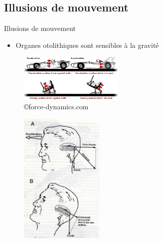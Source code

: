 \documentclass[compress, noflama]{beamer}
\begin{document}
\subsection{Illusions de mouvement}
\begin{frame}{Illusions de mouvement}
\begin{multicols}{2}
\begin{itemize}
\item Organes otolithiques sont sensibles à la gravité
\end{itemize}
\begin{figure}
\centering
\includegraphics[width=5cm]{images/simulateurMovement}
\caption{\copyright force-dynamics.com}
\end{figure}
\begin{figure}
\centering
\includegraphics[width=4cm]{images/Berthoz001}
\caption{\cite{Berthoz1997}}
\end{figure}
\end{multicols}
\end{frame}
\end{document}
